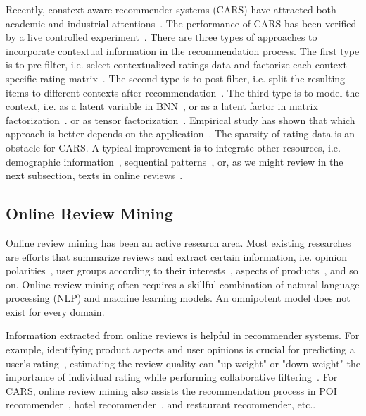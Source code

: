 \documentclass[sigconf]{acmart}
\begin{document}
Recently, constext aware recommender systems (CARS) have attracted both academic and industrial attentions~\cite{Adomavicius2011Context}. The performance of CARS has been verified by a live controlled experiment~\cite{Gorgoglione2011Effect}. There are three types of approaches to incorporate contextual information in the recommendation process. The first type is to pre-filter, i.e. select contextualized ratings data and factorize each context specific rating matrix~\cite{Adomavicius2005Incorporating}. The second type is to post-filter, i.e. split the resulting items to different contexts after recommendation~\cite{Baltrunas2009Context}. The third type is to model the context, i.e. as a latent variable in BNN~\cite{Palmisano2008Using}, or as a latent factor in matrix factorization~\cite{Baltrunas2011Context}. or as tensor factorization~\cite{Wang2015CROWN,Karatzoglou2010Multiverse}. Empirical study has shown that which approach is better depends on the application~\cite{Panniello2009Experimental}. The sparsity of rating data is an obstacle for CARS. A typical improvement is to integrate other resources, i.e. demographic information~\cite{Li2011Towards}, sequential patterns~\cite{Hariri2012Context}, or, as we might review in the next subsection, texts in online reviews~\cite{Li2010Contextual,Levi2012Finding,Hariri2013Query,Liu2013Combining}.



\subsection{Online Review Mining}

Online review  mining has been an active research area. Most existing researches are efforts that summarize reviews and extract certain information, i.e. opinion polarities~\cite{Liu2005Opinion}, user groups according to their interests~\cite{Si2014Users}, aspects of products~\cite{Moghaddam2013FLDA}, and so on. Online review mining often requires a skillful combination of natural language processing (NLP) and machine learning models. An omnipotent model does not exist for every domain.


Information extracted from online reviews is helpful in recommender systems. For example, identifying product aspects and user opinions is crucial for predicting a user's rating~\cite{Qu2010Bag}, estimating the review quality can "up-weight" or "down-weight" the importance of individual rating while performing collaborative filtering~\cite{Raghavan2012Review}. For CARS, online review mining also assists the recommendation process in POI recommender~\cite{Biancalana2013Approach}, hotel recommender~\cite{Levi2012Finding}, and restaurant recommender\cite{Li2010Contextual}, etc..
\end{document}
